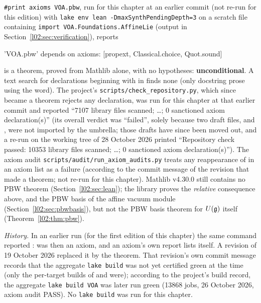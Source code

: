 \begin{status}
\texttt{\#print axioms VOA.pbw}, run for this chapter at an earlier commit (not re-run for this edition) with
\texttt{lake env lean -DmaxSynthPendingDepth=3} on a scratch file containing
\texttt{import VOA.Foundations.AffineLie} (output in Section~\ref{l02:sec:verification}), reports
\begin{plaincode}
'VOA.pbw' depends on axioms: [propext, Classical.choice, Quot.sound]
\end{plaincode}
 is a theorem, proved from Mathlib alone, with no hypotheses: \textbf{unconditional}. A text
search for declarations beginning with  in  finds none (only
docstring prose using the word). The project's \texttt{scripts/check\_repository.py}, which since 
became a theorem rejects any  declaration, was run for this chapter at that earlier commit and
reported ``7107 library files scanned; \ldots; 0 sanctioned axiom declaration(s)'' (its overall verdict was
``failed'', solely because two draft files,  and
, were not imported by the umbrella; those drafts have since
been moved out, and a re-run on the working tree of 28 October 2026 printed ``Repository check passed: 10353
library files scanned; \ldots; 0 sanctioned axiom declaration(s)''). The axiom audit
\texttt{scripts/audit/run\_axiom\_audits.py} treats any reappearance of  in an axiom list as a
failure (according to the commit message of the revision that made  a theorem; not re-run for this chapter). Mathlib v4.30.0 still contains no PBW theorem
(Section~\ref{l02:sec:lean}); the library proves the \emph{relative} consequence above, and the PBW basis of
the affine vacuum module (Section~\ref{l02:sec:pbwbasis}), but not the PBW basis theorem for $U(\mathfrak{g})$
itself (Theorem~\ref{l02:thm:pbw}).

\emph{History.} In an earlier run (for the first edition of this chapter) the same
command reported :  was then an axiom, and an
axiom's own report lists itself. A revision of 19 October 2026 replaced it by the theorem.
That revision's own commit message records that the aggregate \texttt{lake build} was not yet certified green at
the time (only the per-target builds of  and  were);
according to the project's build record, the aggregate \texttt{lake build VOA} was later run green
(13868 jobs, 26 October 2026, axiom audit PASS). No \texttt{lake build} was run for this chapter.
\end{status}

